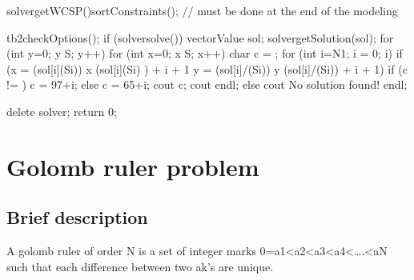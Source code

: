 \documentclass[letterpaper,10pt,openany,oneside,english]{sphinxmanual}
\begin{document}
\begin{sphinxVerbatim}[commandchars=\\\{\}]
    solver\PYGZhy{}\PYGZgt{}getWCSP()\PYGZhy{}\PYGZgt{}sortConstraints(); // must be done at the end of the modeling

    tb2checkOptions();
    if (solver\PYGZhy{}\PYGZgt{}solve()) \PYGZob{}
            vector\PYGZlt{}Value\PYGZgt{} sol;
            solver\PYGZhy{}\PYGZgt{}getSolution(sol);
    	    for (int y=0; y \PYGZlt{} S; y++) \PYGZob{}
                for (int x=0; x \PYGZlt{} S; x++) \PYGZob{}
                    char c = \PYGZsq{} \PYGZsq{};
                    for (int i=N\PYGZhy{}1; i \PYGZgt{}= 0; i\PYGZhy{}\PYGZhy{}) \PYGZob{}
                        if (x \PYGZgt{}= (sol[i]\PYGZpc{}(S\PYGZhy{}i)) \PYGZam{}\PYGZam{} x \PYGZlt{} (sol[i]\PYGZpc{}(S\PYGZhy{}i) ) + i + 1 \PYGZam{}\PYGZam{} y \PYGZgt{}= (sol[i]/(S\PYGZhy{}i)) \PYGZam{}\PYGZam{} y \PYGZlt{} (sol[i]/(S\PYGZhy{}i)) + i + 1) \PYGZob{}
                            if (c != \PYGZsq{} \PYGZsq{}) \PYGZob{}
                                c = 97+i;
                            \PYGZcb{} else \PYGZob{}
                                c = 65+i;
                            \PYGZcb{}
                        \PYGZcb{}
                     \PYGZcb{}
                     cout \PYGZlt{}\PYGZlt{} c;
                \PYGZcb{}
                cout \PYGZlt{}\PYGZlt{} endl;
            \PYGZcb{}
    \PYGZcb{} else \PYGZob{}
            cout \PYGZlt{}\PYGZlt{} \PYGZdq{}No solution found!\PYGZdq{} \PYGZlt{}\PYGZlt{} endl;
    \PYGZcb{}

    delete solver;
    return 0;
\PYGZcb{}

\end{sphinxVerbatim}

\sphinxstepscope


\section{Golomb ruler problem}
\label{\detokenize{examples/tuto_grp:golomb-ruler-problem}}\label{\detokenize{examples/tuto_grp:tuto-grp}}\label{\detokenize{examples/tuto_grp::doc}}



\subsection{Brief description}
\label{\detokenize{examples/tuto_grp:brief-description}}
\sphinxAtStartPar
A golomb ruler of order N is a set of integer marks 0=a1\textless{}a2\textless{}a3\textless{}a4\textless{}….\textless{}aN such that each difference between two ak’s are unique.
\end{document}
